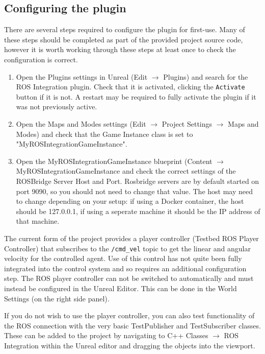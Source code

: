\documentclass[../main.tex]{subfiles}
\begin{document}
\subsection{Configuring the plugin} \label{sec:plugin_config}
There are several steps required to configure the plugin for first-use. Many of these steps should be completed as part of the provided project source code, however it is worth working through these steps at least once to check the configuration is correct.
\begin{enumerate}
    \item Open the Plugins settings in Unreal (Edit \( \rightarrow \) Plugins) and search for the ROS Integration plugin. Check that it is activated, clicking the \texttt{Activate} button if it is not. A restart may be required to fully activate the plugin if it was not previously active.
    \item Open the Maps and Modes settings (Edit \( \rightarrow \) Project Settings \( \rightarrow \) Maps and Modes) and check that the Game Instance class is set to "MyROSIntegrationGameInstance".
    \item Open the MyROSIntegrationGameInstance blueprint (Content \( \rightarrow \) MyROSIntegrationGameInstance and check the correct settings of the ROSBridge Server Host and Port. Rosbridge servers are by default started on port 9090, so you should not need to change that value. The host may need to change depending on your setup: if using a Docker container, the host should be 127.0.0.1, if using a seperate machine it should be the IP address of that machine.
\end{enumerate}

The current form of the project provides a player controller (Testbed ROS Player Controller) that subscribes to the \texttt{/cmd\_vel} topic to get the linear and angular velocity for the controlled agent. Use of this control has not quite been fully integrated into the control system and so requires an additional configuration step. The ROS player controller can not be switched to automatically and must instead be configured in the Unreal Editor. This can be done in the World Settings (on the right side panel). 

If you do not wish to use the player controller, you can also test functionality of the ROS connection with the very basic TestPublisher and TestSubscriber classes. These can be added to the project by navigating to C++ Classes \( \rightarrow \) ROS Integration within the Unreal editor and dragging the objects into the viewport.
\end{document}
